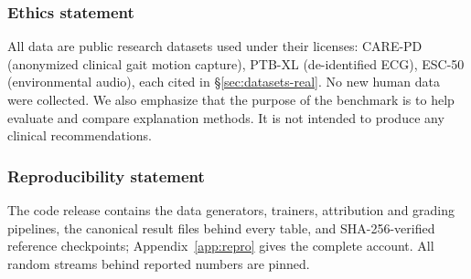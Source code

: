 \documentclass{article} %
\begin{document}
\subsubsection*{Ethics statement}
All data are public research datasets used under their licenses: CARE-PD (anonymized clinical gait motion capture), PTB-XL (de-identified ECG), ESC-50 (environmental audio), each cited in \S\ref{sec:datasets-real}.  No new human data were collected. We also emphasize that the purpose of the benchmark is to help evaluate and compare explanation methods. It is not intended to produce any clinical recommendations.

\subsubsection*{Reproducibility statement}
The code release contains the data generators, trainers, attribution and
grading pipelines, the canonical result files behind every table, and
SHA-256-verified reference checkpoints;
Appendix~\ref{app:repro} gives the complete account.  All random streams
behind reported numbers are pinned.





\newpage
\appendix

\end{document}

